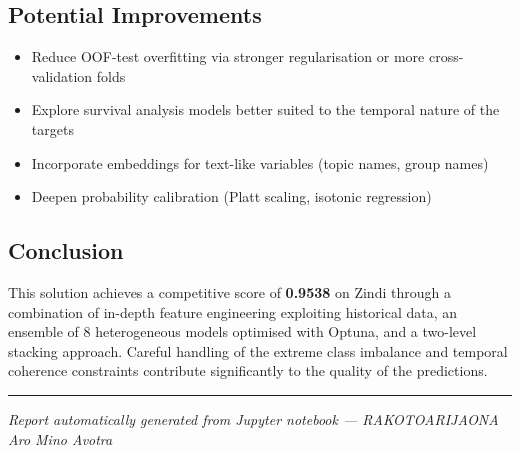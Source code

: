 \documentclass[12pt,a4paper]{article}
\begin{document}
\subsection{Potential Improvements}

\begin{itemize}
    \item Reduce OOF-test overfitting via stronger regularisation or more cross-validation folds
    \item Explore survival analysis models better suited to the temporal nature of the targets
    \item Incorporate embeddings for text-like variables (topic names, group names)
    \item Deepen probability calibration (Platt scaling, isotonic regression)
\end{itemize}

\subsection{Conclusion}

This solution achieves a competitive score of \textbf{0.9538} on Zindi through a combination of in-depth feature engineering exploiting historical data, an ensemble of 8 heterogeneous models optimised with Optuna, and a two-level stacking approach. Careful handling of the extreme class imbalance and temporal coherence constraints contribute significantly to the quality of the predictions.

\vspace{1cm}
\hrule
\vspace{0.3cm}
\begin{center}
\small\textit{Report automatically generated from Jupyter notebook --- RAKOTOARIJAONA Aro Mino Avotra}
\end{center}
\end{document}
